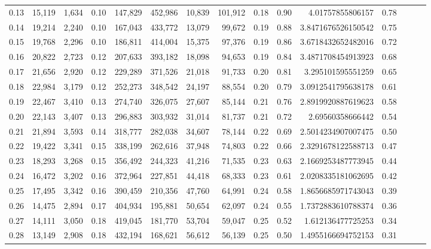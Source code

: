 \begin{tabular}{rrrrrrrrrrrrrrr}
0.13 &  15,119 &  1,634 &  0.10 &  147,829 &  452,986 &   10,839 &  101,912 &  0.18 &  0.90 &        4.01757855806157 &      0.78 \\
0.14 &  19,214 &  2,240 &  0.10 &  167,043 &  433,772 &   13,079 &   99,672 &  0.19 &  0.88 &      3.8471676526150542 &      0.75 \\
0.15 &  19,768 &  2,296 &  0.10 &  186,811 &  414,004 &   15,375 &   97,376 &  0.19 &  0.86 &      3.6718432652482016 &      0.72 \\
0.16 &  20,822 &  2,723 &  0.12 &  207,633 &  393,182 &   18,098 &   94,653 &  0.19 &  0.84 &      3.4871708454913923 &      0.68 \\
0.17 &  21,656 &  2,920 &  0.12 &  229,289 &  371,526 &   21,018 &   91,733 &  0.20 &  0.81 &       3.295101595551259 &      0.65 \\
0.18 &  22,984 &  3,179 &  0.12 &  252,273 &  348,542 &   24,197 &   88,554 &  0.20 &  0.79 &      3.0912541795638178 &      0.61 \\
0.19 &  22,467 &  3,410 &  0.13 &  274,740 &  326,075 &   27,607 &   85,144 &  0.21 &  0.76 &      2.8919920887619623 &      0.58 \\
0.20 &  22,143 &  3,407 &  0.13 &  296,883 &  303,932 &   31,014 &   81,737 &  0.21 &  0.72 &        2.69560358666442 &      0.54 \\
0.21 &  21,894 &  3,593 &  0.14 &  318,777 &  282,038 &   34,607 &   78,144 &  0.22 &  0.69 &      2.5014234907007475 &      0.50 \\
0.22 &  19,422 &  3,341 &  0.15 &  338,199 &  262,616 &   37,948 &   74,803 &  0.22 &  0.66 &      2.3291678122588713 &      0.47 \\
0.23 &  18,293 &  3,268 &  0.15 &  356,492 &  244,323 &   41,216 &   71,535 &  0.23 &  0.63 &      2.1669253487773945 &      0.44 \\
0.24 &  16,472 &  3,202 &  0.16 &  372,964 &  227,851 &   44,418 &   68,333 &  0.23 &  0.61 &      2.0208335181062695 &      0.42 \\
0.25 &  17,495 &  3,342 &  0.16 &  390,459 &  210,356 &   47,760 &   64,991 &  0.24 &  0.58 &      1.8656685971743043 &      0.39 \\
0.26 &  14,475 &  2,894 &  0.17 &  404,934 &  195,881 &   50,654 &   62,097 &  0.24 &  0.55 &      1.7372883610788374 &      0.36 \\
0.27 &  14,111 &  3,050 &  0.18 &  419,045 &  181,770 &   53,704 &   59,047 &  0.25 &  0.52 &       1.612136477725253 &      0.34 \\
0.28 &  13,149 &  2,908 &  0.18 &  432,194 &  168,621 &   56,612 &   56,139 &  0.25 &  0.50 &      1.4955166694752153 &      0.31 \\

\end{tabular}

